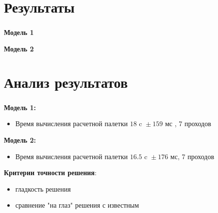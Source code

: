 
\section{Результаты}

\begin{frame}
\frametitle{\insertsection}

\vspace{-0.5cm}
\begin{minipage}[t]{0.47\linewidth}
    \textbf{Модель 1}
\end{minipage}
\hfill
\begin{minipage}[t]{0.47\linewidth}
    \textbf{Модель 2}
\end{minipage}

\end{frame}


\section{Анализ результатов}

\begin{frame}
\frametitle{\insertsection}

\textbf{Модель 1:}
\begin{itemize}
    \item Время вычисления расчетной палетки ${18 \text{ c } \pm 159 \text{ мс }}$, 7 проходов
\end{itemize}

\textbf{Модель 2:}
\begin{itemize}
    \item Время вычисления расчетной палетки ${16.5 \text{ c } \pm 176 \text{ мс}}$, 7 проходов
\end{itemize}

\textbf{Критерии точности решения}:
\begin{itemize}
    \item гладкость решения
    \item сравнение "на глаз" решения с известным
\end{itemize}
\end{frame}


